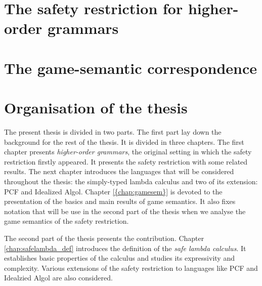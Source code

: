 





\section{The safety restriction for higher-order grammars}

\section{The game-semantic correspondence}


\section{Organisation of the thesis}
The present thesis is divided in two parts. The first part lay down
the background for the rest of the thesis. It is divided in three
chapters. The first chapter presents \emph{higher-order grammars},
the original setting in which the safety restriction firstly
appeared. It presents the safety restriction with some related
results. The next chapter introduces the languages that will be
considered throughout the thesis: the simply-typed lambda calculus
and two of its extension: PCF and Idealized Algol. Chapter
\ref{{chap:gamesem}} is devoted to the presentation of the basics
and main results of game semantics. It also fixes notation that will
be use in the second part of the thesis when we analyse the game
semantics of the safety restriction.

The second part of the thesis presents the contribution. Chapter \ref{chap:safelambda_def} introduces the definition of the \emph{safe lambda calculus}. It establishes basic properties of the calculus and studies its expressivity and complexity.
Various extensions of the safety restriction to languages like PCF and Idealzied Algol are also considered.
